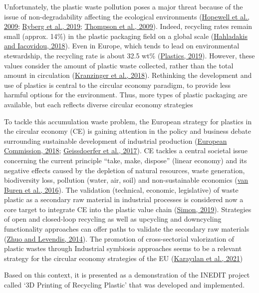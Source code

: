 \documentclass[
  11pt,
]{article}
\begin{document}
Unfortunately, the plastic waste pollution poses a major threat because
of the issue of non-degradability affecting the ecological environments
(\protect\hyperlink{ref-Hopewell2009}{Hopewell et al., 2009};
\protect\hyperlink{ref-Ryberg2019}{Ryberg et al., 2019};
\protect\hyperlink{ref-Thompson2009b}{Thompson et al., 2009}). Indeed,
recycling rates remain small (approx. 14\%) in the plastic packaging
field on a global scale
(\protect\hyperlink{ref-Hahladakis2018}{Hahladakis and Iacovidou,
2018}). Even in Europe, which tends to lead on environmental
stewardship, the recycling rate is about 32.5 wt\%
(\protect\hyperlink{ref-Plastics2019}{Plastics, 2019}). However, these
values consider the amount of plastic waste collected, rather than the
total amount in circulation
(\protect\hyperlink{ref-Kranzinger2018}{Kranzinger et al., 2018}).
Rethinking the development and use of plastics is central to the
circular economy paradigm, to provide less harmful options for the
environment. Thus, more types of plastic packaging are available, but
each reflects diverse circular economy strategies

To tackle this accumulation waste problem, the European strategy for
plastics in the circular economy (CE) is gaining attention in the policy
and business debate surrounding sustainable development of industrial
production (\protect\hyperlink{ref-EC2018}{European Commission, 2018};
\protect\hyperlink{ref-Geissdoerfer2017}{Geissdoerfer et al., 2017}). CE
tackles a central societal issue concerning the current principle
``take, make, dispose'' (linear economy) and its negative effects caused
by the depletion of natural resources, waste generation, biodiversity
loss, pollution (water, air, soil) and non-sustainable economics
(\protect\hyperlink{ref-VanBuren2016}{van Buren et al., 2016}). The
validation (technical, economic, legislative) of waste plastic as a
secondary raw material in industrial processes is considered now a core
target to integrate CE into the plastic value chain
(\protect\hyperlink{ref-Simon2019}{Simon, 2019}). Strategies of open and
closed-loop recycling as well as upcycling and downcycling functionality
approaches can offer paths to validate the secondary raw materials
(\protect\hyperlink{ref-Zhuo2014}{Zhuo and Levendis, 2014}). The
promotion of cross-sectorial valorization of plastic wastes through
Industrial symbiosis approaches seems to be a relevant strategy for the
circular economy strategies of the EU
(\protect\hyperlink{ref-Karaylan2021}{Karayılan et al., 2021})

Based on this context, it is presented as a demonstration of the INEDIT
project called `3D Printing of Recycling Plastic' that was developed and
implemented.
\end{document}
